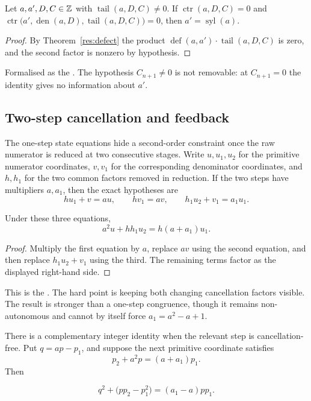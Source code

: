 \documentclass[11pt]{article}
\newcommand{\sylnext}{\operatorname{syl}}
\newcommand{\den}{\operatorname{den}}
\newcommand{\tail}{\operatorname{tail}}
\newcommand{\ctr}{\operatorname{ctr}}
\newcommand{\defect}{\operatorname{def}}
\begin{document}
\begin{theorem}\label{res:step}
Let $a,a',D,C\in\mathbb{Z}$ with $\tail(a,D,C)\ne0$.  If
$\ctr(a,D,C)=0$ and $\ctr\bigl(a',\den(a,D),\tail(a,D,C)\bigr)=0$, then
$a'=\sylnext(a)$.
\end{theorem}

\begin{proof}
By Theorem~\ref{res:defect} the product $\defect(a,a')\cdot\tail(a,D,C)$ is
zero, and the second factor is nonzero by hypothesis.
\end{proof}

\noindent Formalised as the
.  The hypothesis $C_{n+1}\ne0$ is not removable: at $C_{n+1}=0$
the identity gives no information about $a'$.

\subsection{Two-step cancellation and feedback}

The one-step state equations hide a second-order constraint once the raw
numerator is reduced at two consecutive stages.  Write $u,u_1,u_2$ for the
primitive numerator coordinates, $v,v_1$ for the corresponding denominator
coordinates, and $h,h_1$ for the two common factors removed in reduction.  If
the two steps have multipliers $a,a_1$, then the exact hypotheses are
\[
 hu_1+v=au,\qquad hv_1=av,\qquad
 h_1u_2+v_1=a_1u_1.
\]

\begin{theorem}\label{res:secondorder}
Under these three equations,
\[
 a^2u+hh_1u_2=h(a+a_1)u_1.
\]
\end{theorem}

\begin{proof}
Multiply the first equation by $a$, replace $av$ using the second equation,
and then replace $h_1u_2+v_1$ using the third.  The remaining terms factor as
the displayed right-hand side.
\end{proof}

\noindent This is the
.  The hard point is keeping both changing cancellation
factors visible.  The result is stronger than a one-step congruence, though it
remains non-autonomous and cannot by itself force $a_1=a^2-a+1$.

There is a complementary integer identity when the relevant step is
cancellation-free.  Put $q=ap-p_1$, and suppose the next primitive coordinate
satisfies
\[
 p_2+a^2p=(a+a_1)p_1.
\]
Then
\begin{theorem}\label{res:curvature}
\[
 q^2+\bigl(pp_2-p_1^2\bigr)=(a_1-a)pp_1.
\]
\end{theorem}
\end{document}
